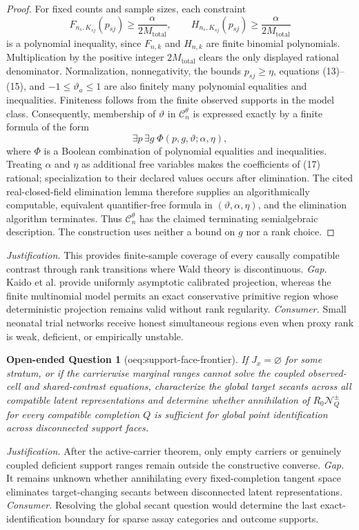 \documentclass{article}
\newtheorem{openendedquestion}{Open-ended Question}
\begin{document}
\begin{proof}
For fixed counts and sample sizes, each constraint
\[
F_{n_s,K_{sj}}(p_{sj})\geq\frac{\alpha}{2M_{\mathrm{total}}},
\qquad
H_{n_s,K_{sj}}(p_{sj})\geq\frac{\alpha}{2M_{\mathrm{total}}}
\tag{16}
\]
is a polynomial inequality, since \(F_{n,k}\) and \(H_{n,k}\) are finite binomial polynomials.  Multiplication by the positive integer \(2M_{\mathrm{total}}\) clears the only displayed rational denominator.  Normalization, nonnegativity, the bounds \(p_{sj}\geq\eta\), equations (13)--(15), and \(-1\leq\vartheta_a\leq1\) are also finitely many polynomial equalities and inequalities.  Finiteness follows from the finite observed supports in the model class.  Consequently, membership of \(\vartheta\) in \(\mathcal C_n^\theta\) is expressed exactly by a finite formula of the form
\[
\exists p\,\exists g\;\Phi(p,g,\vartheta;\alpha,\eta),
\tag{17}
\]
where \(\Phi\) is a Boolean combination of polynomial equalities and inequalities.  Treating \(\alpha\) and \(\eta\) as additional free variables makes the coefficients of (17) rational; specialization to their declared values occurs after elimination.  The cited real-closed-field elimination lemma therefore supplies an algorithmically computable, equivalent quantifier-free formula in \((\vartheta,\alpha,\eta)\), and the elimination algorithm terminates.  Thus \(\mathcal C_n^\theta\) has the claimed terminating semialgebraic description.  The construction uses neither a bound on \(g\) nor a rank choice.
\end{proof}
\par\smallskip\noindent \textit{Justification.} This provides finite-sample coverage of every causally compatible contrast through rank transitions where Wald theory is discontinuous. \textit{Gap.} Kaido et al. provide uniformly asymptotic calibrated projection, whereas the finite multinomial model permits an exact conservative primitive region whose deterministic projection remains valid without rank regularity. \textit{Consumer.} Small neonatal trial networks receive honest simultaneous regions even when proxy rank is weak, deficient, or empirically unstable.

\begin{openendedquestion}[oeq:support-face-frontier]\label{oeq:support-face-frontier}
If \(J_x=\varnothing\) for some stratum, or if the carrierwise marginal ranges cannot solve the coupled observed-cell and shared-contrast equations, characterize the global target secants across all compatible latent representations and determine whether annihilation of \(R_0\mathcal N_Q^{\pm}\) for every compatible completion \(Q\) is sufficient for global point identification across disconnected support faces.
\end{openendedquestion}
\par\smallskip\noindent \textit{Justification.} After the active-carrier theorem, only empty carriers or genuinely coupled deficient support ranges remain outside the constructive converse. \textit{Gap.} It remains unknown whether annihilating every fixed-completion tangent space eliminates target-changing secants between disconnected latent representations. \textit{Consumer.} Resolving the global secant question would determine the last exact-identification boundary for sparse assay categories and outcome supports.
\end{document}
